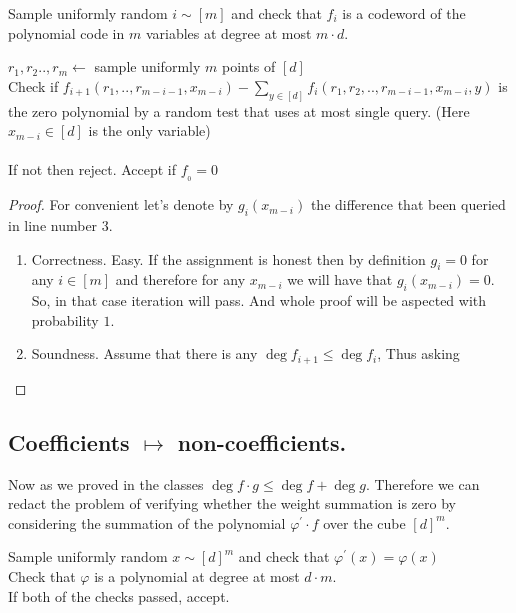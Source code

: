 \documentclass{article}
\begin{document}
\begin{algorithm}[H]
  Sample uniformly random $i \sim [m]$ and check that $f_{i}$ is a codeword of the polynomial code in $m$ variables at degree at most $m\cdot d$.  
    
    $r_{1}, r_{2} .., r_{m} \leftarrow$ sample uniformly  $m$ points of $[d]$ \\
     {
      Check if $f_{i+1}\left( r_{1} , .., r_{m-i-1}, x_{m-i} \right) - \sum_{y \in [d]}{f_{i} \left( r_{1}, r_{2}, .., r_{m-i-1},x_{m-i}, y \right)} $ is the zero polynomial by a random test that uses at most single query. (Here $x_{m-i} \in [d]$ is the only variable)  \\
      \ \\
      If not then reject.  
    }
    Accept if $f_{_0} = 0 $  
\end{algorithm}

\begin{proof} For convenient let's denote by $g_{i}\left( x_{m-i} \right)$ the difference that been queried in line number $3$. 
  \begin{enumerate}
    \item Correctness. Easy. If the assignment is honest then by definition $g_{i} = 0$ for any $i \in [m]$ and therefore for any $x_{m-i}$ we will have that $g_{i} \left( x_{m-i} \right) = 0$. So, in that case iteration will pass. And whole proof will be aspected  with probability $1$.  
    \item Soundness. Assume that there is   any $\deg f_{i+1}  \le \deg f_{i}$, Thus asking 
  \end{enumerate}
\end{proof}

\subsection{ Coefficients $\mapsto$ non-coefficients. }
Now as we proved in the classes $\deg f \cdot g \le \deg f + \deg g$. Therefore we can redact  the problem of verifying whether the weight summation is zero by considering the summation of the polynomial $\varphi^{\prime} \cdot f$ over the cube $[d]^{m}$. 


\begin{algorithm}[H]
  Sample uniformly random $x \sim  [d]^{m}$ and check that $\varphi^{\prime}\left( x \right) = \varphi\left( x \right)$   \\
  Check that $\varphi$ is a polynomial at degree at most $d\cdot m$. \\
  If both of the checks passed, accept. 
\end{algorithm}
\end{document}
